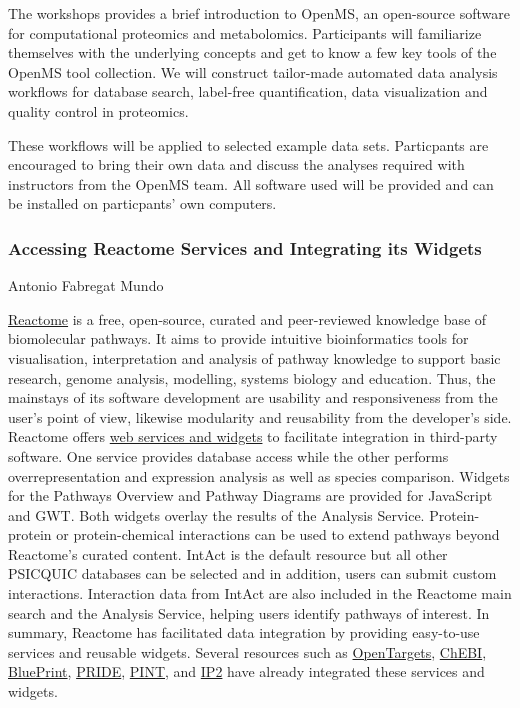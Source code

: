 The workshops provides a brief introduction to OpenMS, an open-source software
for computational proteomics and metabolomics. Participants will familiarize
themselves with the underlying concepts and get to know a few key tools of the
OpenMS tool collection. We will construct tailor-made automated data analysis
workflows for database search, label-free quantification, data visualization and
quality control in proteomics.

These workflows will be applied to selected example data sets. Particpants are
encouraged to bring their own data and discuss the analyses required with
instructors from the OpenMS team. All software used will be provided and can be
installed on particpants' own computers.


\subsubsection*{\color{eubicRed} Accessing Reactome Services and Integrating its Widgets}
{\color{eubicGray} Antonio Fabregat Mundo}

\href{http://www.reactome.org}{Reactome} is a free, open-source, curated and peer-reviewed knowledge base of biomolecular pathways. It aims to provide intuitive bioinformatics tools for visualisation, interpretation and analysis of pathway knowledge to support basic research, genome analysis, modelling, systems biology and education. Thus, the mainstays of its software development are usability and responsiveness from the user’s point of view, likewise modularity and reusability from the developer’s side. Reactome offers \href{http://goo.gl/koRvhp}{web services and widgets}  to facilitate integration in third-party software. One service provides database access while the other performs overrepresentation and expression analysis as well as species comparison. Widgets for the Pathways Overview and Pathway Diagrams are provided for JavaScript and GWT. Both widgets overlay the results of the Analysis Service. Protein-protein or protein-chemical interactions can be used to extend pathways beyond Reactome’s curated content. IntAct is the default resource but all other PSICQUIC databases can be selected and in addition, users can submit custom interactions. Interaction data from IntAct are also included in the Reactome main search and the Analysis Service, helping users identify pathways of interest. In summary, Reactome has facilitated data integration by providing easy-to-use services and reusable widgets. Several resources such as \href{https://www.targetvalidation.org/}{OpenTargets}, \href{https://www.ebi.ac.uk/chebi/}{ChEBI}, \href{http://dcc.blueprint-epigenome.eu/}{BluePrint}, \href{http://www.ebi.ac.uk/pride/archive/}{PRIDE}, \href{http://sealion.scripps.edu/pint}{PINT}, and \href{http://goldfish.scripps.edu}{IP2} have already integrated these services and widgets.
